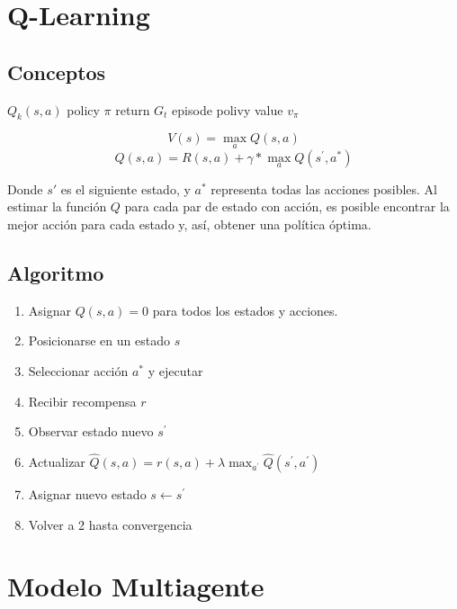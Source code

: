 \section{Q-Learning}

\subsection{Conceptos}

$Q_k(s,a)$
policy $\pi$
return $G_t$ 
episode
polivy value $v_\pi$




$$
V(s) = \max_{a}{Q(s,a)}
$$
$$
Q(s, a) = R(s, a) + \gamma * \max_{a}{Q(s^{'}, a^{*})}
$$

Donde $s{'}$ es el siguiente estado, y $a^{*}$ representa todas las acciones posibles. Al estimar la funci\'on $Q$ para cada par de estado con acci\'on, es posible encontrar la mejor acci\'on para cada estado y, as\'i, obtener una pol\'itica \'optima.

\subsection{Algoritmo}

\begin{enumerate}
    \item Asignar $Q(s,a) = 0$ para todos los estados y acciones.
    \item Posicionarse en un estado $s$
    \item Seleccionar acci\'on $a^{*}$ y ejecutar
    \item Recibir recompensa $r$
    \item Observar estado nuevo $s^{'}$
    \item Actualizar $\hat{Q}(s,a) = r(s,a) + \lambda \max _{ a^{'} }{  \hat{Q}(s^{'},a^{'}) }$
    \item Asignar nuevo estado $s \leftarrow s^{'}$
    \item Volver a 2 hasta convergencia
\end{enumerate}



\section{Modelo Multiagente}

